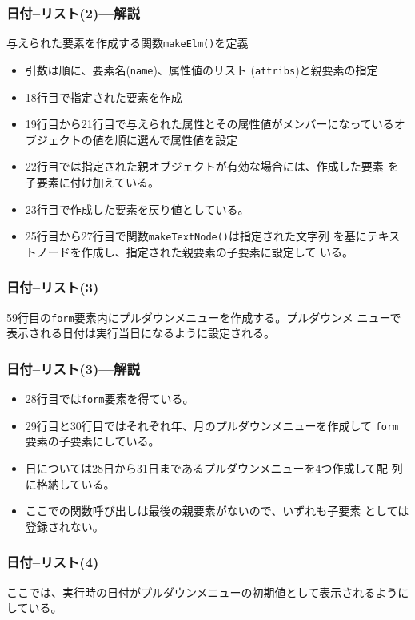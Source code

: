 \begin{frame}[containsverbatim]
\frametitle{日付--リスト(2)---解説}
与えられた要素を作成する関数\texttt{makeElm()}を定義
\begin{itemize}
 \item 引数は順に、要素名(\texttt{name})、属性値のリスト
       (\texttt{attribs})と親要素の指定
 \item 18行目で指定された要素を作成
 \item 19行目から21行目で与えられた属性とその属性値がメンバーになっているオ
       ブジェクトの値を順に選んで属性値を設定
 \item 22行目では指定された親オブジェクトが有効な場合には、作成した要素
       を子要素に付け加えている。
 \item 23行目で作成した要素を戻り値としている。
 \item 25行目から27行目で関数\texttt{makeTextNode()}は指定された文字列
			 を基にテキストノードを作成し、指定された親要素の子要素に設定して
			 いる。
\end{itemize}
\end{frame}
\begin{frame}[containsverbatim]
\frametitle{日付--リスト(3)}
59行目の\texttt{form}要素内にプルダウンメニューを作成する。プルダウンメ
 ニューで表示される日付は実行当日になるように設定される。
\end{frame}
\begin{frame}[containsverbatim]
\frametitle{日付--リスト(3)---解説}
\begin{itemize}
 \item 28行目では\texttt{form}要素を得ている。
 \item 29行目と30行目ではそれぞれ年、月のプルダウンメニューを作成して
       \texttt{form}要素の子要素にしている。
 \item 日については28日から31日まであるプルダウンメニューを4つ作成して配
       列に格納している。
 \item ここでの関数呼び出しは最後の親要素がないので、いずれも子要素
       としては登録されない。
\end{itemize}
\end{frame}
\begin{frame}[containsverbatim]
\frametitle{日付--リスト(4)}
ここでは、実行時の日付がプルダウンメニューの初期値として表示されるように
 している。
\end{frame}
